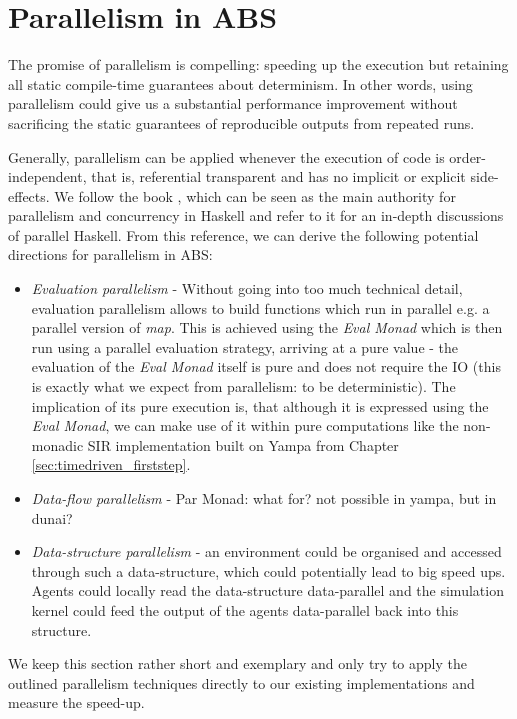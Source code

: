 \section{Parallelism in ABS}
The promise of parallelism is compelling: speeding up the execution but retaining all static compile-time guarantees about determinism. In other words, using parallelism could give us a substantial performance improvement without sacrificing the static guarantees of reproducible outputs from repeated runs.

Generally, parallelism can be applied whenever the execution of code is order-independent, that is, referential transparent and has no implicit or explicit side-effects. We follow the book \cite{marlow_parallel_2013}, which can be seen as the main authority for parallelism and concurrency in Haskell and refer to it for an in-depth discussions of parallel Haskell. From this reference, we can derive the following potential directions for parallelism in ABS:

\begin{itemize}
	\item \textit{Evaluation parallelism} - Without going into too much technical detail, evaluation parallelism allows to build functions which run in parallel e.g. a parallel version of \textit{map}. This is achieved using the \textit{Eval Monad} which is then run using a parallel evaluation strategy, arriving at a pure value - the evaluation of the \textit{Eval Monad} itself is pure and does not require the IO (this is exactly what we expect from parallelism: to be deterministic). The implication of its pure execution is, that although it is expressed using the \textit{Eval Monad}, we can make use of it within pure computations like the non-monadic SIR implementation built on Yampa from Chapter \ref{sec:timedriven_firststep}.

	\item \textit{Data-flow parallelism } - Par Monad: what for? not possible in yampa, but in dunai?
	
	\item \textit{Data-structure parallelism} - an environment could be organised and accessed through such a data-structure, which could potentially lead to big speed ups. Agents could locally read the data-structure data-parallel and the simulation kernel could feed the output of the agents data-parallel back into this structure.
	

\end{itemize}

We keep this section rather short and exemplary and only try to apply the outlined parallelism techniques directly to our existing implementations and measure the speed-up. 









